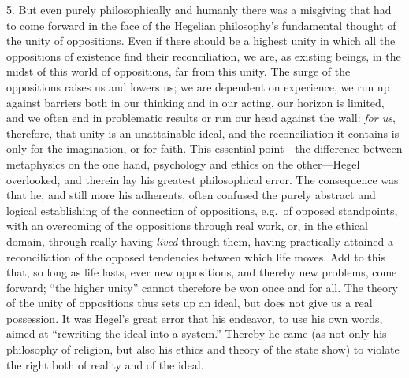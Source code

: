 \documentclass[12pt,a4paper]{book}
\newcommand{\opage}[1]{\marginnote{\footnotesize\textit{[#1]}}}
\begin{document}
5. But even purely philosophically and humanly there
was a misgiving that had to come forward in the face of the Hegelian
philosophy's fundamental thought of the unity of oppositions. Even if
there should be a highest unity in which all the oppositions of existence
find their reconciliation, we are, as existing beings, in the midst of
this world of oppositions, far from this unity. The surge of the
oppositions raises us and lowers us; we are dependent on experience, we
run up against barriers both in our thinking and in our acting, our
horizon is limited, and we often end in problematic results or run our
head against the wall: \textit{for us}, therefore, that unity is an
unattainable ideal, and the reconciliation it contains is only for the
imagination, or for faith. This essential point---the difference between
metaphysics on the one hand, psychology and ethics on the other---Hegel
overlooked, and therein lay his greatest philosophical error. The
consequence was that he, and still more his adherents, often confused the
purely abstract and logical establishing of the connection of
oppositions, e.g.\ of opposed standpoints, with an overcoming of the
oppositions through real work, or, in the ethical domain, through really
having \textit{lived} through them, having practically attained a
reconciliation of the opposed tendencies between which life moves. Add
to this that, so long as life lasts, ever new oppositions, and thereby
new problems, come forward; ``the higher unity'' cannot therefore be won
once and for all. The theory of the unity of oppositions thus sets up an
ideal, but does not give us a real possession. It was Hegel's great error
that his endeavor,
\opage{14}to use his own words, aimed at ``rewriting the ideal into a system.''
Thereby he came (as not only his philosophy of religion, but also his
ethics and theory of the state show) to violate the right both of reality
and of the ideal.
\end{document}

